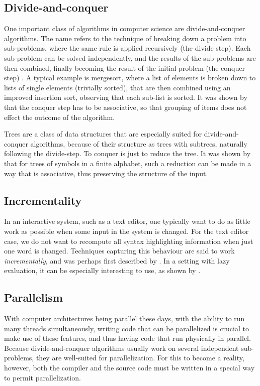 \documentclass[a4paper,12pt,twosided]{report}
\renewcommand\cite{\citep}
\begin{document}
\subsection{Divide-and-conquer}
One important class of algorithms in computer science are divide-and-conquer 
algorithms. The name refers to the technique of breaking down a problem into
sub-problems, where the same rule is applied recursively (the divide step). Each
sub-problem can be solved independently, and the results of the sub-problems are
then combined, finally becoming the result of the initial problem (the conquer
step) \cite[p.209]{algorithmdesign}. A typical example is mergesort, where a
list of elements is broken down to lists of single elements (trivially sorted),
that are then combined using an improved insertion sort, observing that each
sub-list is sorted. It was shown by \citet{birdlists} that the conquer step has
to be associative, so that grouping of items does not effect the outcome of the
algorithm. 

Trees are a class of data structures that are especially suited for 
divide-and-conquer algorithms, because of their structure as trees with
subtrees, naturally following the divide-step. To conquer is just to reduce the
tree. It was shown by \citet{parparsepaper} that for trees of symbols in a
finite alphabet, such a reduction can be made in a way that is associative, thus
preserving the structure of the input. 

\subsection{Incrementality}
In an interactive system, such as a text editor, one typically want to do as
little work as possible when some input in the system is changed. For the text
editor case, we do not want to recompute all syntax highlighting information when
just one word is changed. Techniques capturing this behaviour are said to work
\textit{incrementally}, and was perhaps first described by
\cite{incrementalpaper}. In a setting with lazy evaluation, it can be
especially interesting to use, as shown by \cite{lazyfunctional}.

\subsection{Parallelism}
With computer architectures being parallel these days, with the ability to run
many threads simultaneously, writing code that can be parallelized is crucial to
make use of these features, and thus having code that run physically in
parallel. Because divide-and-conquer algorithms usually work on several
independent sub-problems, they are well-suited for parallelization. For this to
become a reality, however, both the compiler and the source code must be written
in a special way to permit parallelization.
\end{document}
